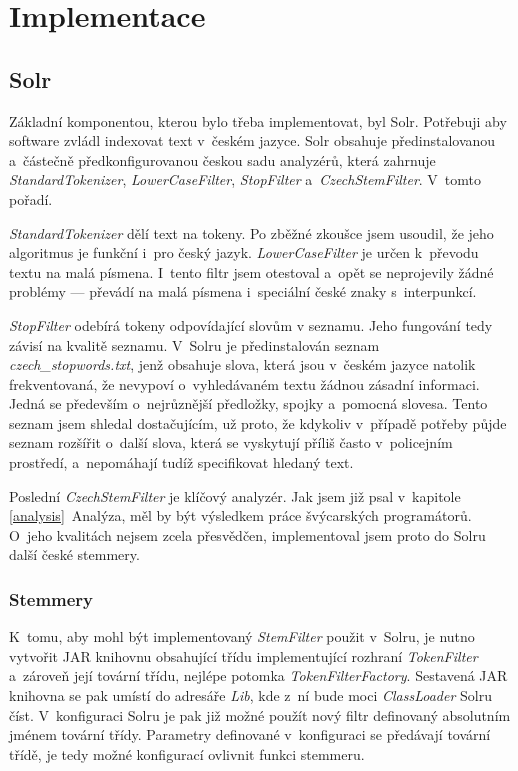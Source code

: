 \chapter{Implementace}
\section{Solr}
Základní komponentou, kterou bylo třeba implementovat, byl Solr. Potřebuji aby software zvládl indexovat text v~českém jazyce. Solr obsahuje předinstalovanou a~částečně předkonfigurovanou českou sadu analyzérů, která zahrnuje \emph{StandardTokenizer}, \emph{LowerCaseFilter}, \emph{StopFilter} a~\emph{CzechStemFilter}. V~tomto pořadí.

\emph{StandardTokenizer} dělí text na tokeny. Po zběžné zkoušce jsem usoudil, že jeho algoritmus je funkční i~pro český jazyk. \emph{LowerCaseFilter} je určen k~převodu textu na malá písmena. I~tento filtr jsem otestoval a~opět se neprojevily žádné problémy --- převádí na malá písmena i~speciální české znaky s~interpunkcí. 

\emph{StopFilter} odebírá tokeny odpovídající slovům v seznamu. Jeho fungování tedy závisí na kvalitě seznamu. V~Solru je předinstalován seznam \\\emph{czech\_stopwords.txt}, jenž obsahuje slova, která jsou v~českém jazyce natolik frekventovaná, že nevypoví o~vyhledávaném textu žádnou zásadní informaci. Jedná se především o~nejrůznější předložky, spojky a~pomocná slovesa. Tento seznam jsem shledal dostačujícím, už proto, že kdykoliv v~případě potřeby půjde seznam rozšířit o~další slova, která se vyskytují příliš často v~policejním prostředí, a~nepomáhají tudíž specifikovat hledaný text.

Poslední \emph{CzechStemFilter} je klíčový analyzér. Jak jsem již psal v~kapitole \ref{analysis}~Analýza, měl by být výsledkem práce švýcarských programátorů. O~jeho kvalitách nejsem zcela přesvědčen, implementoval jsem proto do Solru další české stemmery.

\subsection{Stemmery}
K~tomu, aby mohl být implementovaný \emph{StemFilter} použit v~Solru, je nutno vytvořit JAR knihovnu obsahující třídu implementující rozhraní \emph{TokenFilter} a~zároveň její tovární třídu, nejlépe potomka \emph{TokenFilterFactory}. Sestavená JAR knihovna se pak umístí do adresáře \emph{Lib}, kde z~ní bude moci \emph{ClassLoader} Solru číst. V~konfiguraci Solru je pak již možné použít nový filtr definovaný absolutním jménem tovární třídy. Parametry definované v~konfiguraci se předávají tovární třídě, je tedy možné konfigurací ovlivnit funkci stemmeru.

